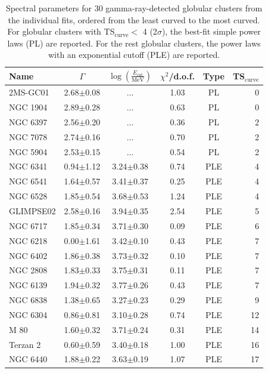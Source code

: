 \documentclass[doublespace,nopageskip]{VTthesis}
\begin{document}
\begin{table}
\centering
\caption{Spectral parameters for 30 gamma-ray-detected globular clusters from the individual fits, ordered from the least curved to the most curved. For globular clusters with TS$_\mathrm{curve} <$ 4 (2$\sigma$), the best-fit simple power laws (PL) are reported. For the rest globular clusters, the power laws with an exponential cutoff (PLE) are reported. }\label{tab:spectra}
\begin{threeparttable}
\begin{tabular}{lccccr}
\toprule
Name&$\Gamma$ & $\log\left(\frac{E_\mathrm{cut}}{\mathrm{MeV}}\right)$ & $\chi^2$/d.o.f. & Type\tnote{a} & TS$_\mathrm{curve}$\\
\midrule
2MS-GC01 & {2.68$\pm$0.08} & ... & 1.03 & PL & 0 \\
NGC 1904 & {2.89$\pm$0.28} & ... & 0.63 & PL & 0 \\
NGC 6397 & {2.56$\pm$0.20} & ... & 0.36 & PL & 2 \\
NGC 7078 & {2.74$\pm$0.16} & ... & 0.70 & PL & 2 \\
NGC 5904 & {2.53$\pm$0.15} & ... & 0.54 & PL & 2 \\
\midrule
NGC 6341 & 0.94$\pm$1.12 & {3.24$\pm$0.38} & 0.74 & PLE & 4 \\
NGC 6541 & 1.64$\pm$0.57 & {3.41$\pm$0.37} & 0.25 & PLE & 4 \\
NGC 6528 & 1.85$\pm$0.54 & {3.68$\pm$0.53} & 1.24 & PLE & 4 \\
GLIMPSE02 & 2.58$\pm$0.16 & {3.94$\pm$0.35} & 2.54 & PLE & 5 \\
NGC 6717 & 1.85$\pm$0.34 & {3.71$\pm$0.30} & 0.09 & PLE & 6 \\
NGC 6218 & 0.00$\pm$1.61 & {3.42$\pm$0.10} & 0.43 & PLE & 7 \\
NGC 6402 & 1.86$\pm$0.38 & {3.73$\pm$0.32} & 0.10 & PLE & 7 \\
NGC 2808 & 1.83$\pm$0.33 & {3.75$\pm$0.31} & 0.11 & PLE & 7 \\
NGC 6139 & 1.94$\pm$0.32 & {3.77$\pm$0.26} & 0.43 & PLE & 7 \\
NGC 6838 & 1.38$\pm$0.65 & {3.27$\pm$0.23} & 0.29 & PLE & 9 \\
NGC 6304 & 0.86$\pm$0.81 & {3.10$\pm$0.28} & 0.74 & PLE & 12 \\
M 80 & 1.60$\pm$0.32 & {3.71$\pm$0.24} & 0.31 & PLE & 14 \\
Terzan 2 & 0.60$\pm$0.59 & {3.40$\pm$0.18} & 1.00 & PLE & 16 \\
NGC 6440 & 1.88$\pm$0.22 & {3.63$\pm$0.19} & 1.07 & PLE & 17 \\

\end{tabular}
\end{threeparttable}
\end{table}
\end{document}
